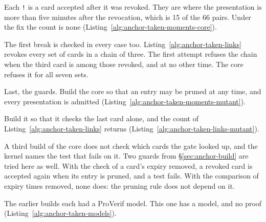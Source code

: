 
Each \texttt{!} is a card accepted after it was revoked. They are where
the presentation is more than five minutes after the revocation, which is
15 of the 66 pairs. Under the fix the count is none
(Listing~\ref{alg:anchor-taken-moments-core}).


The first break is checked in every case too.
Listing~\ref{alg:anchor-taken-links} revokes every set of cards in a chain of
three. The first attempt refuses the chain when the third card is among those
revoked, and at no other time. The core refuses it for all seven sets.


Last, the guards. Build the core so that an entry may be pruned at any
time, and every presentation is admitted
(Listing~\ref{alg:anchor-taken-moments-mutant}).


Build it so that it checks the last card alone, and the count of
Listing~\ref{alg:anchor-taken-links} returns
(Listing~\ref{alg:anchor-taken-links-mutant}).

A third build of the core does not check which cards the gate looked up,
and the kernel names the test that fails on it. Two guards from
\S\ref{sec:anchor-build} are tried here as well. With the check of a
card's expiry removed, a revoked card is accepted again when its entry is
pruned, and a test fails. With the comparison of expiry times removed, none
does: the pruning rule does not depend on it.


The earlier builds each had a ProVerif model. This one has a model, and
no proof (Listing~\ref{alg:anchor-taken-models}).


